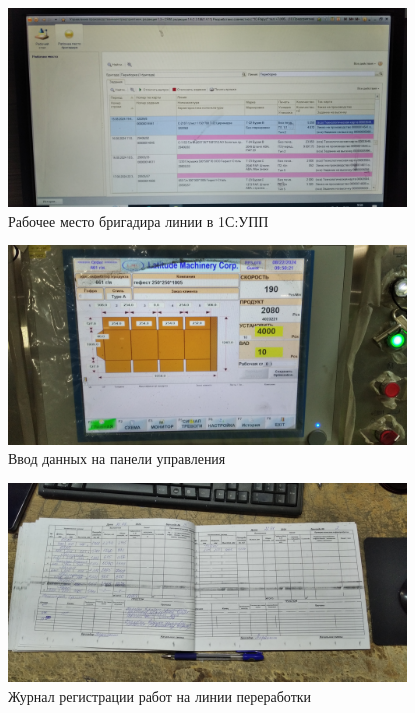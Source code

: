 \begin{figure}
\begin{center}
  \includegraphics[height=0.94\textheight, width=0.94\textwidth, keepaspectratio]{Pics 1/7 рабочее место бригадира.jpg}
\end{center}
  \caption{Рабочее место бригадира линии в 1С:УПП}
  \label{pic:7 рабочее место бригадира}
\end{figure}

\begin{figure}
\begin{center}
  \includegraphics[height=0.94\textheight, width=0.94\textwidth, keepaspectratio]{Pics 1/7 Внесение данных из ТК в программу линии.jpg}
\end{center}
  \caption{Ввод данных на панели управления}
  \label{pic:7 Внесение данных из ТК в программу линии}
\end{figure}

\begin{figure}
\begin{center}
  \includegraphics[height=0.94\textheight, width=0.94\textwidth, keepaspectratio]{Pics 1/7 журнал на линии 2.jpg}
\end{center}
  \caption{Журнал регистрации работ на линии переработки}
  \label{pic:7 журнал на линии 2}
\end{figure}

